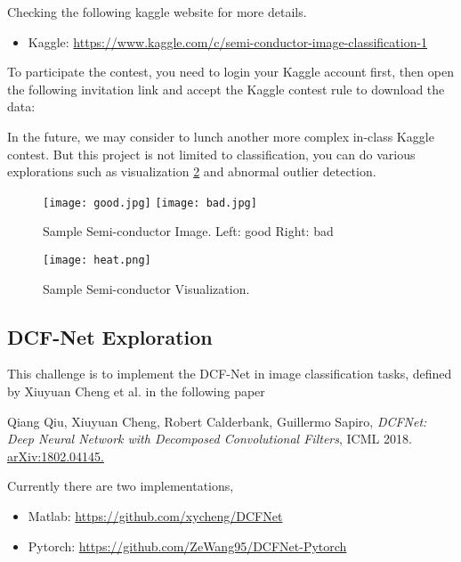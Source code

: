 \documentclass[11pt]{article}
\begin{document}
Checking the following kaggle website for more details. 
\begin{itemize}
	\item Kaggle: \url{https://www.kaggle.com/c/semi-conductor-image-classification-1}
\end{itemize}
\noindent To participate the contest, you need to login your Kaggle account first, then open the following invitation link and accept the Kaggle contest rule to download the data: 

{}

\noindent In the future, we may consider to lunch another more complex in-class Kaggle contest. But this project is not limited to classification, you can do various explorations such as visualization \ref{fig:heatmap} and abnormal outlier detection.

\begin{figure}[htbp]
\begin{centering}
	\texttt{[image: good.jpg]}  
	\texttt{[image: bad.jpg]}  
	\caption{Sample Semi-conductor Image. Left: good Right: bad}
	\label{fig:nexperia}
	\end{centering}
\end{figure}
\begin{figure}[htbp]
\begin{centering}
	\texttt{[image: heat.png]}  
	\caption{Sample Semi-conductor Visualization.}
	\label{fig:heatmap}
\end{centering}
\end{figure}

\subsection{DCF-Net Exploration}
This challenge is to implement the DCF-Net in image classification tasks, defined by Xiuyuan Cheng et al. in the following paper

Qiang Qiu, Xiuyuan Cheng, Robert Calderbank, Guillermo Sapiro, \emph{DCFNet: Deep Neural Network with Decomposed Convolutional Filters}, ICML 2018. \url{arXiv:1802.04145.}

\noindent Currently there are two implementations, 
\begin{itemize}
\item Matlab:
\url{https://github.com/xycheng/DCFNet}
\item Pytorch:
\url{https://github.com/ZeWang95/DCFNet-Pytorch}
\end{itemize}
\end{document}
